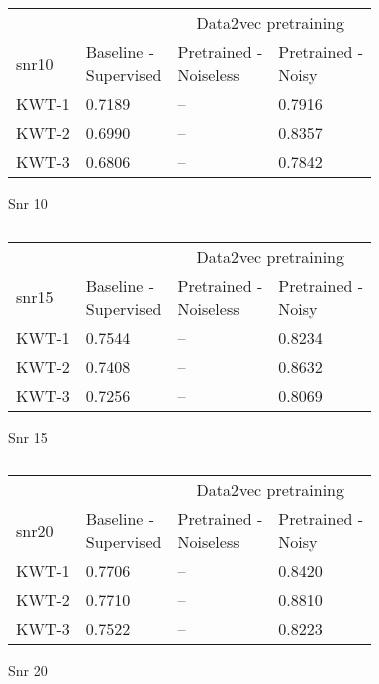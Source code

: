 \begin{table}[ht]
    \begin{subtable}[ht]{0.45\textwidth}
        \centering
        \begin{tabular}{@{}llll@{}}
        \toprule
        & & \multicolumn{2}{c}{Data2vec pretraining} \\ \cline{3-4}
        snr10    & \makecell{ Baseline - \\ Supervised } & \makecell{ Pretrained - \\ Noiseless } & \makecell{ Pretrained - \\ Noisy } \\ \midrule
        KWT-1    & 0.7189  & -- & 0.7916 \\
        KWT-2    & 0.6990  & -- & 0.8357 \\
        KWT-3    & 0.6806  & -- & 0.7842 \\
        \bottomrule
        \end{tabular}
        \caption{Snr 10}
    \end{subtable}
    \hfill
    \begin{subtable}[ht]{0.45\textwidth}
        \centering
        \begin{tabular}{@{}llll@{}}
        \toprule
        & & \multicolumn{2}{c}{Data2vec pretraining} \\ \cline{3-4}
        snr15    & \makecell{ Baseline - \\ Supervised } & \makecell{ Pretrained - \\ Noiseless } & \makecell{ Pretrained - \\ Noisy } \\ \midrule
        KWT-1    & 0.7544  & -- & 0.8234 \\
        KWT-2    & 0.7408  & -- & 0.8632 \\
        KWT-3    & 0.7256  & -- & 0.8069 \\
        \bottomrule
        \end{tabular}
        \caption{Snr 15}
    \end{subtable}

    
    \bigskip


    \begin{subtable}[ht]{0.45\textwidth}
        \centering
        \begin{tabular}{@{}llll@{}}
        \toprule
        & & \multicolumn{2}{c}{Data2vec pretraining} \\ \cline{3-4}
        snr20    & \makecell{ Baseline - \\ Supervised } & \makecell{ Pretrained - \\ Noiseless } & \makecell{ Pretrained - \\ Noisy } \\ \midrule
        KWT-1    & 0.7706  & -- & 0.8420 \\
        KWT-2    & 0.7710  & -- & 0.8810 \\
        KWT-3    & 0.7522  & -- & 0.8223 \\
        \bottomrule
        \end{tabular}
        \caption{Snr 20}
    \end{subtable}
    \caption{}
    \label{tab:test_more_noise_snrmix}
\end{table}
